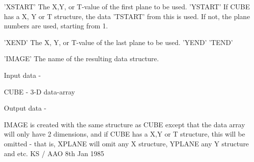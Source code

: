 \begin{description}
\begin{terminalv}
 'XSTART'   The X,Y, or T-value of the first plane to be used.
 'YSTART'   If CUBE has a X, Y or T  structure, the data
 'TSTART'   from this is used.  If not, the plane numbers
            are used, starting from 1.

 'XEND'     The X, Y, or T-value of the last plane to be used.
 'YEND'
 'TEND'

 'IMAGE'    The name of the resulting data structure.

 Input data -

 CUBE - 3-D data-array

 Output data -

 IMAGE is created with the same structure as CUBE
 except that the data array will only have 2 dimensions, and if
 CUBE has a X,Y or T structure, this will be omitted -
 that is, XPLANE will omit any X structure, YPLANE any
 Y structure and  etc.
                                 KS / AAO 8th Jan 1985
\end{terminalv}
\end{description}

